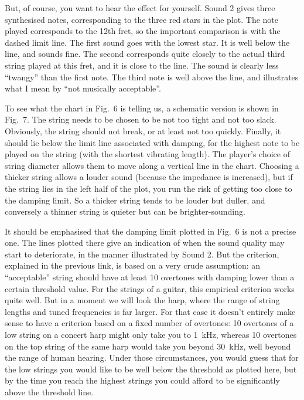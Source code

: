   But, of course, you want to hear the effect for yourself. Sound 2 gives three 
  synthesised notes, corresponding to the three red stars in the plot. The note 
  played corresponds to the 12th fret, so the important comparison is with the 
  dashed limit line. The first sound goes with the lowest star. It is well 
  below the line, and sounds fine. The second corresponds quite closely to the 
  actual third string played at this fret, and it is close to the line. The 
  sound is clearly less ``twangy'' than the first note. The third note is well 
  above the line, and illustrates what I mean by ``not musically acceptable''. 

  To see what the chart in Fig.\ 6 is telling us, a schematic version is shown 
  in Fig.\ 7. The string needs to be chosen to be not too tight and not too 
  slack. Obviously, the string should not break, or at least not too quickly. 
  Finally, it should lie below the limit line associated with damping, for the 
  highest note to be played on the string (with the shortest vibrating length). 
  The player's choice of string diameter allows them to move along a vertical 
  line in the chart. Choosing a thicker string allows a louder sound (because 
  the impedance is increased), but if the string lies in the left half of the 
  plot, you run the risk of getting too close to the damping limit. So a 
  thicker string tends to be louder but duller, and conversely a thinner string 
  is quieter but can be brighter-sounding. 


  It should be emphasised that the damping limit plotted in Fig.\ 6 is not a 
  precise one. The lines plotted there give an indication of when the sound 
  quality may start to deteriorate, in the manner illustrated by Sound 2. But 
  the criterion, explained in the previous link, is based on a very crude 
  assumption: an ``acceptable'' string should have at least 10 overtones with 
  damping lower than a certain threshold value. For the strings of a guitar, 
  this empirical criterion works quite well. But in a moment we will look the 
  harp, where the range of string lengths and tuned frequencies is far larger. 
  For that case it doesn't entirely make sense to have a criterion based on a 
  fixed number of overtones: 10 overtones of a low string on a concert harp 
  might only take you to 1~kHz, whereas 10 overtones on the top string of the 
  same harp would take you beyond 30~kHz, well beyond the range of human 
  hearing. Under those circumstances, you would guess that for the low strings 
  you would like to be well below the threshold as plotted here, but by the 
  time you reach the highest strings you could afford to be significantly above 
  the threshold line. 

